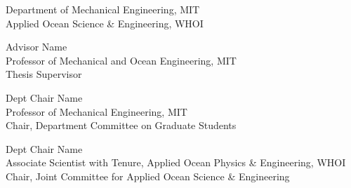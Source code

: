 \begin{titlepage}
\begin{center}
\begin{singlespace}
    \signature{Author}{\small Department of Mechanical Engineering, MIT \\ Applied Ocean Science \& Engineering, WHOI \\ \@date}
    \vspace{1em}
    \signature{Certified by}{Advisor Name \\ \small Professor of Mechanical and Ocean Engineering, MIT \\ Thesis Supervisor}
    \vspace{1em}
    \signature{Accepted by}{Dept Chair Name \\ \small Professor of Mechanical Engineering, MIT \\ Chair, Department Committee on Graduate Students}
    \vspace{1em}
    \signature{Accepted by}{Dept Chair Name \\ \small Associate Scientist with Tenure, Applied Ocean Physics \& Engineering, WHOI \\ Chair, Joint Committee for Applied Ocean Science \& Engineering}
    \end{singlespace}
  \end{center}
  \makeatother
\end{titlepage}

\newpage
\null
\thispagestyle{empty}
\newpage